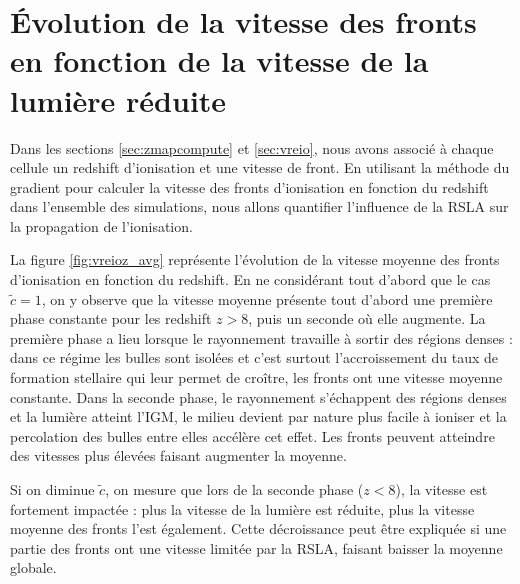 


\section{Évolution de la vitesse des fronts en fonction de la vitesse de la lumière réduite}
\label{sec:compfrontspeep}

Dans les sections \ref{sec:zmapcompute} et \ref{sec:vreio}, nous avons associé à chaque cellule un redshift d'ionisation et une vitesse de front.
En utilisant la méthode du gradient pour calculer la vitesse des fronts d'ionisation en fonction du redshift dans l'ensemble des simulations, nous allons quantifier l'influence de la \ac{RSLA} sur la propagation de l'ionisation.


La figure \ref{fig:vreioz_avg} représente l'évolution de la vitesse moyenne des fronts d'ionisation en fonction du redshift.
En ne considérant tout d'abord que le cas  $\tilde{c}=1$, on y observe que la vitesse moyenne présente tout d'abord une première phase constante pour les redshift $z>8$, puis un seconde où elle augmente.
La première phase a lieu lorsque le rayonnement travaille à sortir des régions denses : dans ce régime les bulles sont isolées et c'est surtout l'accroissement du taux de formation stellaire qui leur permet de croître, les fronts ont une vitesse moyenne constante.
Dans la seconde phase, le rayonnement s'échappent des régions denses et la lumière atteint l'\ac{IGM}, le milieu devient par nature plus facile à ioniser et la percolation des bulles entre elles accélère cet effet.
Les fronts peuvent atteindre des vitesses plus élevées faisant augmenter la moyenne.

Si on diminue $\tilde{c}$, on mesure que lors de la seconde phase ($z<8$), la vitesse est fortement impactée : plus la vitesse de la lumière est réduite, plus la vitesse moyenne des fronts l'est également.
Cette décroissance peut être expliquée si une partie des fronts ont une vitesse limitée par la \ac{RSLA}, faisant baisser la moyenne globale.

